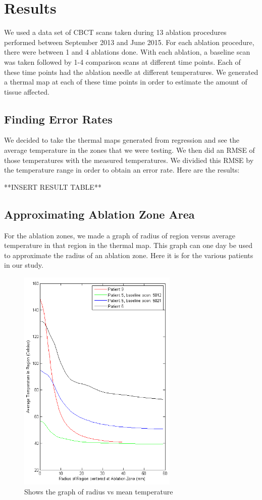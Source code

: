 \documentclass[]{spie}  %
\begin{document}
\section{Results}

We used a data set of CBCT scans taken during 13 ablation procedures performed between September 2013 and June 2015. For each ablation procedure, there were between 1 and 4 ablations done. With each ablation, a baseline scan was taken followed by 1-4 comparison scans at different time points. Each of these time points had the ablation needle at different temperatures. We generated a thermal map at each of these time points in order to estimate the amount of tissue affected. 

\subsection{Finding Error Rates}

We decided to take the thermal maps generated from regression and see the average temperature in the zones that we were testing. We then did an RMSE of those temperatures with the measured temperatures. We dividied this RMSE by the temperature range in order to obtain an error rate. Here are the results:

**INSERT RESULT TABLE**

\subsection{Approximating Ablation Zone Area}

For the ablation zones, we made a graph of radius of region versus average temperature in that region in the thermal map. This graph can one day be used to approximate the radius of an ablation zone. Here it is for the various patients in our study. 

\begin{figure} 
\centering 
\includegraphics[width=3in]{meanTempVsRadiusFull.png} 
\caption{Shows the graph of radius vs mean temperature} 
\end{figure}
\end{document}
